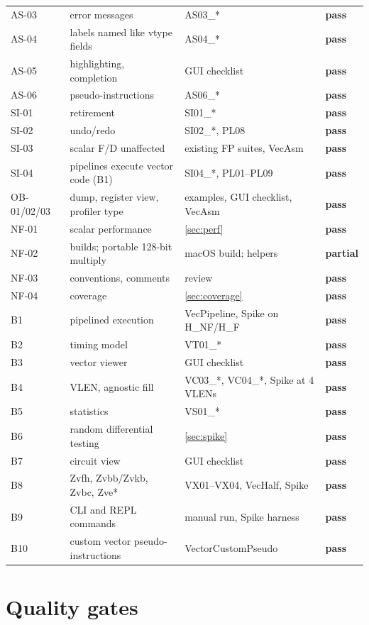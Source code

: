 \documentclass[11pt]{article}
\newcommand{\pass}{\textcolor{kstretch}{\textsf{\textbf{pass}}}}
\newcommand{\partly}{\textcolor{kshould}{\textsf{\textbf{partial}}}}
\begin{document}
\begin{longtable}{@{}L{1.9cm}L{7.0cm}L{4.4cm}L{1.2cm}@{}}
AS-03 & error messages & AS03\_* & \pass \\
AS-04 & labels named like vtype fields & AS04\_* & \pass \\
AS-05 & highlighting, completion & GUI checklist & \pass \\
AS-06 & pseudo-instructions & AS06\_* & \pass \\
SI-01 & retirement & SI01\_* & \pass \\
SI-02 & undo/redo & SI02\_*, PL08 & \pass \\
SI-03 & scalar F/D unaffected & existing FP suites, VecAsm & \pass \\
SI-04 & pipelines execute vector code (B1) & SI04\_*, PL01--PL09 & \pass \\
OB-01/02/03 & dump, register view, profiler type & examples, GUI checklist, VecAsm & \pass \\
NF-01 & scalar performance & \cref{sec:perf} & \pass \\
NF-02 & builds; portable 128-bit multiply & macOS build; helpers & \partly \\
NF-03 & conventions, comments & review & \pass \\
NF-04 & coverage & \cref{sec:coverage} & \pass \\
\midrule
B1 & pipelined execution & VecPipeline, Spike on H\_NF/H\_F & \pass \\
B2 & timing model & VT01\_* & \pass \\
B3 & vector viewer & GUI checklist & \pass \\
B4 & VLEN, agnostic fill & VC03\_*, VC04\_*, Spike at 4 VLENs & \pass \\
B5 & statistics & VS01\_* & \pass \\
B6 & random differential testing & \cref{sec:spike} & \pass \\
B7 & circuit view & GUI checklist & \pass \\
B8 & Zvfh, Zvbb/Zvkb, Zvbc, Zve* & VX01--VX04, VecHalf, Spike & \pass \\
B9 & CLI and REPL commands & manual run, Spike harness & \pass \\
B10 & custom vector pseudo-instructions & VectorCustomPseudo & \pass \\
\bottomrule
\end{longtable}
\normalsize

\section{Quality gates}\label{sec:gates}
\end{document}
